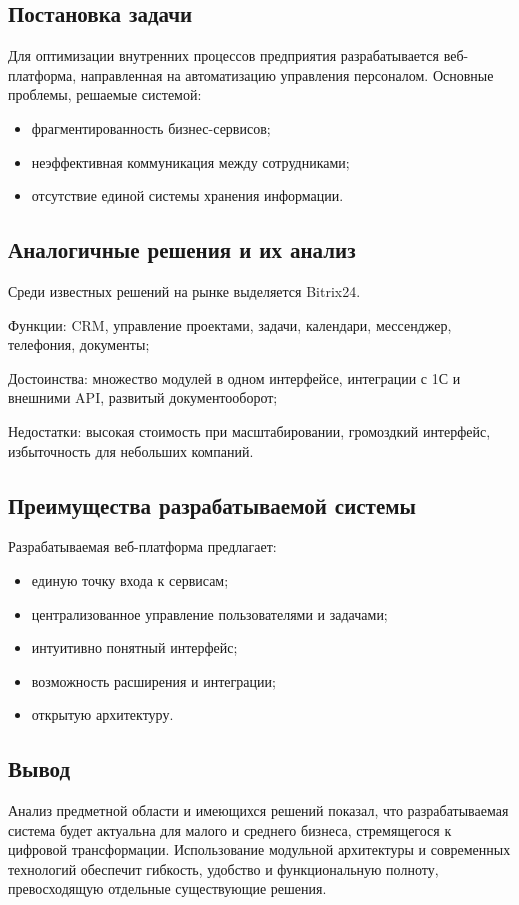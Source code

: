 \subsection{Постановка задачи}

Для оптимизации внутренних процессов предприятия разрабатывается веб-платформа, направленная на автоматизацию управления персоналом. Основные проблемы, решаемые системой:

\begin{itemize}
  \item фрагментированность бизнес-сервисов;
  \item неэффективная коммуникация между сотрудниками;
  \item отсутствие единой системы хранения информации.
\end{itemize}

\subsection{Аналогичные решения и их анализ}

Среди известных решений на рынке выделяется Bitrix24.

Функции: CRM, управление проектами, задачи, календари, мессенджер, телефония, документы;

Достоинства: множество модулей в одном интерфейсе, интеграции с 1С и внешними API, развитый документооборот;

Недостатки: высокая стоимость при масштабировании, громоздкий интерфейс, избыточность для небольших компаний.


\subsection{Преимущества разрабатываемой системы}

Разрабатываемая веб-платформа предлагает:

\begin{itemize}
  \item единую точку входа к сервисам;
  \item централизованное управление пользователями и задачами;
  \item интуитивно понятный интерфейс;
  \item возможность расширения и интеграции;
  \item открытую архитектуру.
\end{itemize}

\subsection{Вывод}

Анализ предметной области и имеющихся решений показал, что разрабатываемая система будет актуальна для малого и среднего бизнеса, стремящегося к цифровой трансформации. Использование модульной архитектуры и современных технологий обеспечит гибкость, удобство и функциональную полноту, превосходящую отдельные существующие решения.